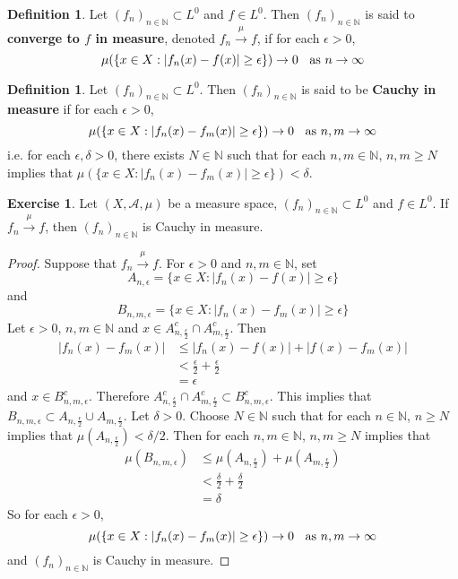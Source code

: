 \documentclass[12pt]{amsart}
\theoremstyle{definition}
\newtheorem{defn}[definition]{Definition}
\newtheorem{ex}[definition]{Exercise}
\newcommand{\del}{\delta}
\newcommand{\ep}{\epsilon}
\newcommand{\N}{\mathbb{N}}
\newcommand{\MA}{\mathcal{A}}
\newcommand{\conv}[1]{\xrightarrow{#1}}
\newcommand{\lex}[1]{\label{ex:#1}}
\newcommand{\ld}[1]{\label{defn:#1}}
\begin{document}
	\begin{defn} \ld{35001} 
		Let $(f_n)_{n \in \N} \subset L^0$ and $f \in L^0$. Then $(f_n)_{n \in \N}$ is said to \textbf{converge to $f$ in measure}, denoted $f_n \xrightarrow{\mu} f$, if for each $\ep > 0$, $$\mu(\{x \in X: |f_n(x) - f(x)| \geq \ep \}) \rightarrow 0 \hspace{.2cm }\text{ as } n \rightarrow \infty$$
	\end{defn}
	
	\begin{defn} \ld{35002} 
	Let $(f_n)_{n \in \N} \subset L^0$. Then $(f_n)_{n \in \N}$ is said to be \textbf{Cauchy in measure} if for each $\ep >0$, $$\mu(\{x \in X: |f_n(x) - f_m(x)| \geq \ep \}) \rightarrow 0 \hspace{.2cm }\text{ as } n,m \rightarrow \infty$$ 
	i.e. for each $\ep, \del >0$, there exists $N \in \N$ such that for each $n,m \in \N$, $n,m \geq N$ implies that $\mu(\{x \in X: |f_n(x) - f_m(x)| \geq \ep \}) < \del$.
	\end{defn}
	
	\begin{ex} \lex{35002.1} 
	Let $(X, \MA, \mu)$ be a measure space, $(f_n)_{n \in \N} \subset L^0$ and $f \in L^0$. If $f_n \conv{\mu} f$, then $(f_n)_{n \in \N}$ is Cauchy in measure.
	\end{ex}
	
	\begin{proof}
	Suppose that $f_n \conv{\mu} f$. For $\ep >0$ and $n,m \in \N$, set 
	$$A_{n, \ep} = \{x \in X: |f_n(x) - f(x)| \geq \ep \}$$ 
	and 
	$$B_{n,m, \ep} = \{x \in X: |f_n(x) - f_m(x)| \geq \ep \}$$
	Let $\ep >0$, $n, m \in \N$ and $x \in A_{n, \frac{\ep}{2}}^c \cap A_{m, \frac{\ep}{2}}^c$. Then 
	\begin{align*}
	|f_n(x) - f_m(x)| 
	& \leq  |f_n(x) - f(x)| + |f(x) - f_m(x)| \\
	& < \frac{\ep}{2} + \frac{\ep}{2} \\
	&= \ep  
	\end{align*}
	and $x \in B_{n,m, \ep}^c$. Therefore $A_{n, \frac{\ep}{2}}^c \cap A_{m, \frac{\ep}{2}}^c \subset B_{n,m, \ep}^c$. This implies that $B_{n,m, \ep} \subset A_{n, \frac{\ep}{2}} \cup A_{m, \frac{\ep}{2}}$. Let $\del >0$. Choose $N \in \N$ such that for each $n \in \N$, $n \geq N$ implies that $\mu(A_{n, \frac{\ep}{2}}) < \del/2$. Then for each $n,m \in \N$, $n, m \geq N$ implies that 
	\begin{align*}
	\mu(B_{n,m, \ep}) 
	&\leq \mu(A_{n, \frac{\ep}{2}}) + \mu(A_{m, \frac{\ep}{2}}) \\
	& < \frac{\del}{2} + \frac{\del}{2} \\
	&= \del
	\end{align*}
	So for each $\ep >0$, $$\mu(\{x \in X: |f_n(x) - f_m(x)| \geq \ep \}) \rightarrow 0 \hspace{.2cm }\text{ as } n,m \rightarrow \infty$$  
	and $(f_n)_{n \in \N}$ is Cauchy in measure.
	\end{proof}
	
\end{document}
